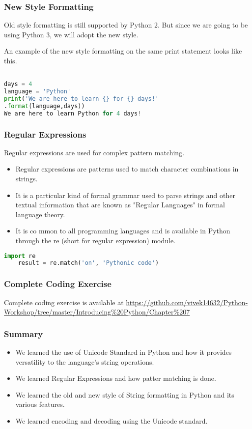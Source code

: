 \documentclass{beamer}
\begin{document}
\begin{frame}[fragile]
\frametitle{New Style Formatting}
Old style formatting is still supported by Python 2. But since we are going to be using Python 3, we will adopt the new style.


An example of the new style formatting on the same print statement looks like this.
\begin{lstlisting}[language=Python]

days = 4
language = 'Python'
print('We are here to learn {} for {} days!'
.format(language,days))
We are here to learn Python for 4 days!
\end{lstlisting}
\end{frame}

\begin{frame}[fragile]
\frametitle{Regular Expressions}
Regular expressions are used for complex pattern matching.
\begin{itemize}
\item Regular expressions are patterns used to match character combinations in strings.
\item It is a particular kind of formal grammar used to parse strings and other textual information that are known as "Regular Languages" in formal language theory.
\item It is co	mmon to all programming languages and is available in Python through the re (short for regular expression) module.
\end{itemize}
\begin{lstlisting}[language=Python]
	import re
	result = re.match('on', 'Pythonic code')
\end{lstlisting}
\end{frame}

\begin{frame}
\frametitle{Complete Coding Exercise}
Complete coding exercise is available at \url{https://github.com/vivek14632/Python-Workshop/tree/master/Introducing\%20Python/Chapter\%207}
\end{frame}

\begin{frame}
\frametitle{Summary}
\begin{itemize}
\item We learned the use of Unicode Standard in Python and how it provides versatility to the language's string operations.
\item We learned Regular Expressions and how patter matching is done.
\item We learned the old and new style of String formatting in Python and its various features.
\item We learned encoding and decoding using the Unicode standard. 
\end{itemize}
\end{frame}
\end{document}
